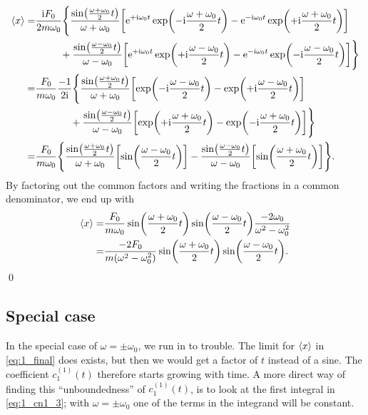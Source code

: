 \documentclass[11pt,letter, swedish, english
]{article}
\begin{document}
\begin{equation}
\begin{aligned}
\ev{x}=&\frac{\ii F_0}{2 m\omega_0}\Bigg\{
\frac{\sin(\frac{\omega+\omega_0}{2}t)}
{\omega+\omega_0}
\qty[
\ee^{+\ii\omega_0t}\exp(-\ii\frac{\omega+\omega_0}{2}t)-
\ee^{-\ii\omega_0t}\exp(+\ii\frac{\omega+\omega_0}{2}t)
] \\ & \hspace{25pt}
+\frac{\sin(\frac{\omega-\omega_0}{2}t)}
{\omega-\omega_0}
\qty[\ee^{+\ii\omega_0t}\exp(+\ii\frac{\omega-\omega_0}{2}t)
-\ee^{-\ii\omega_0t}\exp(-\ii\frac{\omega-\omega_0}{2}t)
]
\Bigg\}\\
=&\frac{F_0}{m\omega_0}\frac{-1}{2\ii}\Bigg\{
\frac{\sin(\frac{\omega+\omega_0}{2}t)}
{\omega+\omega_0}
\qty[
\exp(-\ii\frac{\omega-\omega_0}{2}t)-
\exp(+\ii\frac{\omega-\omega_0}{2}t)
] \\ & \hspace{35pt}
+\frac{\sin(\frac{\omega-\omega_0}{2}t)}
{\omega-\omega_0}
\qty[\exp(+\ii\frac{\omega+\omega_0}{2}t)
-\exp(-\ii\frac{\omega+\omega_0}{2}t)
]
\Bigg\}\\
=&\frac{F_0}{m\omega_0}
\Bigg\{
\frac{\sin(\frac{\omega+\omega_0}{2}t)}
{\omega+\omega_0}
\qty[ \sin(\frac{\omega-\omega_0}{2}t) ] 
-\frac{\sin(\frac{\omega-\omega_0}{2}t)}
{\omega-\omega_0}
\qty[\sin(\frac{\omega+\omega_0}{2}t)
] \Bigg\}.\\
\end{aligned}
\end{equation}
By factoring out the common factors and writing the fractions in a
common denominator, we end up with
\begin{equation}\label{eq:1_final}
\begin{aligned}
\ev{x}=&\frac{F_0}{m\omega_0}
\sin(\frac{\omega+\omega_0}{2}t)
\sin(\frac{\omega-\omega_0}{2}t)
\frac{-2\omega_0}{\omega^2-\omega_0^2}\\
=&\frac{-2F_0}{m\qty(\omega^2-\omega_0^2)}
\sin(\frac{\omega+\omega_0}{2}t)
\sin(\frac{\omega-\omega_0}{2}t).
\end{aligned}
\end{equation}
\qed

\subsection*{Special case}
In the special case of $\omega=\pm\omega_0$, we run in to trouble. The
limit for $\ev{x}$ in \eqref{eq:1_final} does exists, but then we
would get a factor of $t$ instead of a sine. The coefficient
$c^{(1)}_1(t)$ therefore starts growing with time. A more direct way
of finding this ``unboundedness'' of $c^{(1)}_1(t)$, is to look at the
first integral in \eqref{eq:1_cn1_3}; with $\omega=\pm\omega_0$ one of
the terms in the integrand will be constant. 
\end{document}
